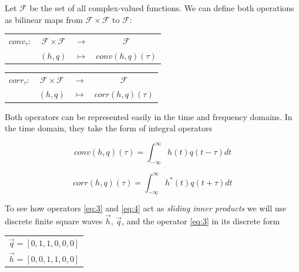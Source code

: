 Let $\mathcal{F}$ be the set of all complex-valued functions. We can define both operations as bilinear maps from $\mathcal{F}\times\mathcal{F}$ to $\mathcal{F}$:

\vspace{1cm}

\begin{center}

\begin{tabular}{cccc}
$conv_\tau:$&$\mathcal{F}\times\mathcal{F}$ & $\rightarrow$ & $\mathcal{F}$ \\
&$(h, q)$ &$\mapsto$ & $conv(h,q)(\tau)$
\end{tabular}

\end{center}

\vspace{1cm}

\begin{center}

\begin{tabular}{cccc}
$corr_\tau:$&$\mathcal{F}\times\mathcal{F}$ & $\rightarrow$ & $\mathcal{F}$ \\
&$(h, q)$ &$\mapsto$ & $corr(h,q)(\tau)$
\end{tabular}

\end{center}

\vspace{1cm}

Both operators can be represented easily in the time and frequency domains. In the time domain, they take the form of integral operators 

\begin{equation}\label{eq:3}
conv(h, q)(\tau)= \int_{-\infty}^{\infty} h(t)q(t-\tau)dt
\end{equation}


\begin{equation}\label{eq:4}
corr(h, q)(\tau)= \int_{-\infty}^{\infty} h^*(t)q(t+\tau)dt
\end{equation}

To see how operators \ref{eq:3} and \ref{eq:4} act as \textit{sliding inner products} we will use discrete finite square waves $\vec{h}$, $\vec{q}$, and the operator \ref{eq:3} in its discrete form 


\vspace{0.5cm}

\begin{center}

\begin{tabular}{c}
$ \vec{q} = [0,1,1,0,0,0]$ \\
$ \vec{h} = [0,0,1,1,0,0]$

\end{tabular}

\end{center}

